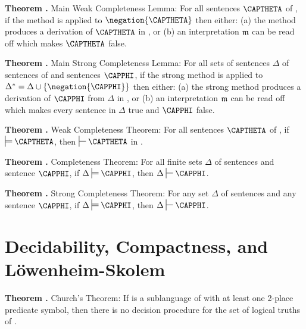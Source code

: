 \begin{majorILnc}{\textbf{Theorem .} Main Weak \GQD{} Completeness Lemma:}
For all sentences $\CAPTHETA$ of \GQL{}, if the method is applied to $\negation{\CAPTHETA}$ then either: (a) the method produces a derivation of $\CAPTHETA$ in \GQDP{}, or (b) an interpretation $\mathfrak{m}$ can be read off which makes $\CAPTHETA$ false.
\end{majorILnc}

\begin{majorILnc}{\textbf{Theorem .} Main Strong \GQD{} Completeness Lemma:}
For all sets of sentences $\Delta$ of sentences of \GQL{} and \GQL{} sentences $\CAPPHI$, if the strong method is applied to $\Delta^*=\Delta\cup\{\negation{\CAPPHI}\}$ then either: (a) the strong method produces a derivation of $\CAPPHI$ from $\Delta$ in \GQDP{}, or (b) an interpretation $\mathfrak{m}$ can be read off which makes every sentence in $\Delta$ true and $\CAPPHI$ false.
\end{majorILnc}

\begin{majorILnc}{\textbf{Theorem .} Weak \GQD{} Completeness Theorem:}
For all sentences $\CAPTHETA$ of \GQL{}, if $\sdtstile{}{}\CAPTHETA$, then $\sststile{}{}\CAPTHETA$ in \GQD{}.
\end{majorILnc}

\begin{majorILnc}{\textbf{Theorem .} \GQD{} Completeness Theorem:}
For all finite sets $\Delta$ of \GQL{} sentences and \GQL{} sentence $\CAPPHI$, if $\Delta\sdtstile{}{}\CAPPHI$, then $\Delta\sststile{}{}\CAPPHI$.
\end{majorILnc}

\begin{majorILnc}{\textbf{Theorem .} Strong \GQD{} Completeness Theorem:}
For any set $\Delta$ of \GSL{} sentences and any \GSL{} sentence $\CAPPHI$, if $\Delta\sdtstile{}{}\CAPPHI$, then $\Delta\sststile{}{}\CAPPHI$.
\end{majorILnc}

\section*{Decidability, Compactness, and L\"owenheim-Skolem}

\begin{majorILnc}{\textbf{Theorem .} Church's Theorem:}
If  is a sublanguage of \GQL{} with at least one 2-place predicate symbol, then there is no decision procedure for the set of logical truths of .
\end{majorILnc}

